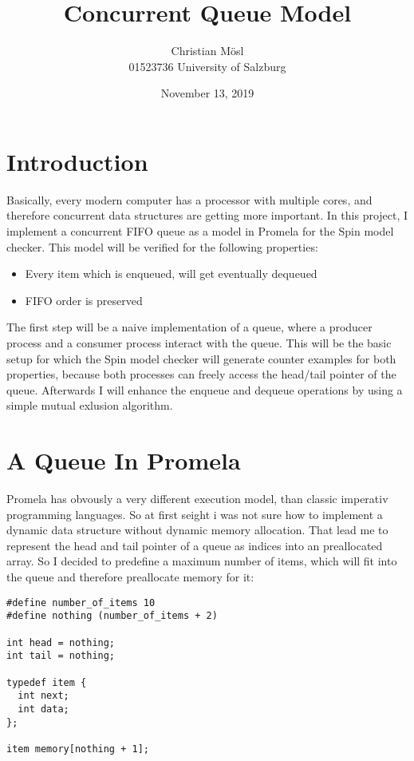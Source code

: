 \documentclass{article}
\title{Concurrent Queue Model}
\author{Christian M\"osl \\
        01523736
        University of Salzburg}
\date{November 13, 2019}
\begin{document}
\maketitle

\section{Introduction}
Basically, every modern computer has a processor with multiple cores, and therefore concurrent data structures are getting more important. In this project, I implement a concurrent FIFO queue as a model in Promela for the Spin model checker. This model will be verified for the following properties:

\begin{itemize}
    \item Every item which is enqueued, will get eventually dequeued
    \item FIFO order is preserved
\end{itemize}

The first step will be a naive implementation of a queue, where a producer process and a consumer process interact with the queue. 
This will be the basic setup for which the Spin model checker will generate counter examples for both properties, because both processes can freely access the head/tail pointer of the queue. 
Afterwards I will enhance the enqueue and dequeue operations by using a simple mutual exlusion algorithm.

\section{A Queue In Promela}
Promela has obvously a very different execution model, than classic imperativ programming languages. 
So at first seight i was not sure how to implement a dynamic data structure without dynamic memory allocation. 
That lead me to represent the head and tail pointer of a queue as indices into an preallocated array.
So I decided to predefine a maximum number of items, which will fit into the queue and therefore preallocate memory for it:

\begin{lstlisting}[language=Promela]
#define number_of_items 10
#define nothing (number_of_items + 2)

int head = nothing;
int tail = nothing;

typedef item {
  int next;
  int data;
};

item memory[nothing + 1];
\end{lstlisting}
\end{document}
